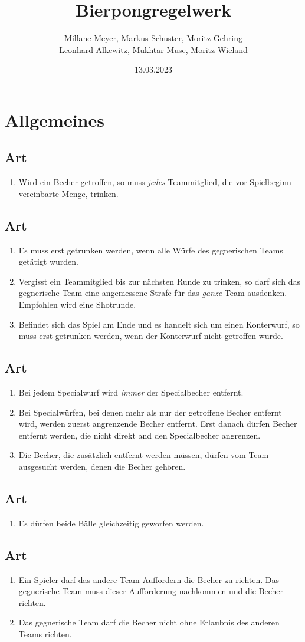 \documentclass[a4paper,11pt]{scrartcl}
\title{\Huge{Bierpongregelwerk}}
\author{Millane Meyer, Markus Schuster, Moritz Gehring \\Leonhard Alkewitz, Mukhtar Muse, Moritz Wieland}
\date{\small{13.03.2023}}
\newcommand{\enum}[1]{\begin{enumerate}[label=(\arabic*)]#1\end{enumerate}}
\newcommand{\art}[2]{\subsection*{#1} \enum{#2}}
\newcounter{art}
\begin{document}
\maketitle
\vspace*{-1cm}
\newpage

\section{Allgemeines}
    \art{Art \theart}{
        \item
            Wird ein Becher getroffen, so muss \emph{jedes} Teammitglied, die vor Spielbeginn vereinbarte Menge, trinken.
    }

    \art{Art \theart}{
        \item
            Es muss erst getrunken werden, wenn alle Würfe des gegnerischen Teams getätigt wurden.
        \item
            Vergisst ein Teammitglied bis zur nächsten Runde zu trinken, so darf sich das gegnerische Team eine angemessene Strafe für das \emph{ganze} Team ausdenken. Empfohlen wird eine Shotrunde.
        \item
            Befindet sich das Spiel am Ende und es handelt sich um einen Konterwurf, so muss erst getrunken werden, wenn der Konterwurf nicht getroffen wurde.
    }

    \art{Art \theart}{
        \item
            Bei jedem Specialwurf wird \emph{immer} der Specialbecher entfernt.
        \item
            Bei Specialwürfen, bei denen mehr als nur der getroffene Becher entfernt wird, werden zuerst angrenzende Becher entfernt. Erst danach dürfen Becher entfernt werden, die nicht direkt and den Specialbecher angrenzen.
        \item
            Die Becher, die zusätzlich entfernt werden müssen, dürfen vom Team ausgesucht werden, denen die Becher gehören.
    }

    \art{Art \theart}{
        \item
            Es dürfen beide Bälle gleichzeitig geworfen werden.
    }

    \art{Art \theart}{
        \item
            Ein Spieler darf das andere Team Auffordern die Becher zu richten. Das gegnerische Team muss dieser Aufforderung nachkommen und die Becher richten.
        \item
            Das gegnerische Team darf die Becher nicht ohne Erlaubnis des anderen Teams richten.
    }
\end{document}
